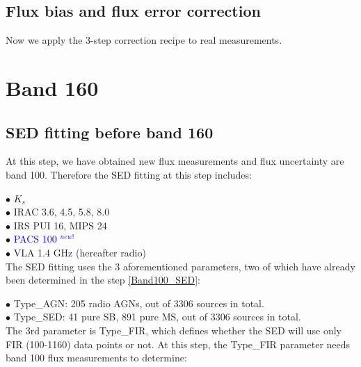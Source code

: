 \documentclass[11pt,a4paper]{article}
\begin{document}
\subsection{Flux bias and flux error correction}
\label{Band100_dfcorr}

Now we apply the 3-step correction recipe to real measurements. 


\clearpage

\section{Band 160}

\subsection{SED fitting before band 160}
\label{Band160_Galsed}

At this step, we have obtained new flux measurements and flux uncertainty are band 100. Therefore the SED fitting at this step includes:

\indent\hspace{15pt}$\bullet$ $K_s$
\\
\indent\hspace{15pt}$\bullet$ IRAC 3.6, 4.5, 5.8, 8.0
\\
\indent\hspace{15pt}$\bullet$ IRS PUI 16, MIPS 24
\\
\indent\hspace{15pt}$\bullet$ \textcolor{blue}{PACS 100 $^{new!}$}
\\
\indent\hspace{15pt}$\bullet$ VLA 1.4 GHz (hereafter radio) 
\\

The SED fitting uses the 3 aforementioned parameters, two of which have already been determined in the step \ref{Band100_SED}:

\indent\hspace{15pt}$\bullet$ 
Type\_AGN: 205 radio AGNs, out of 3306 sources in total. 
\\
\indent\hspace{15pt}$\bullet$ 
Type\_SED: 41 pure SB, 891 pure MS, out of 3306 sources in total. 
\\

The 3rd parameter is Type\_FIR, which defines whether the SED will use only FIR (100-1160) data points or not. At this step, the Type\_FIR parameter needs band 100 flux measurements to determine: 
\end{document}
